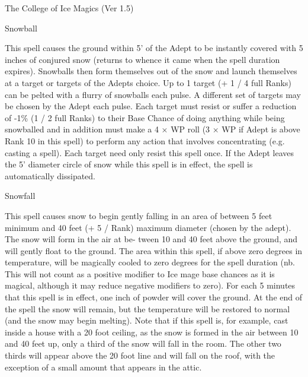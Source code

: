 \begin{Chapter}{The College of Ice Magics (Ver 1.5)}
\begin{spell}[S-13]{Snowball}
\begin{effects}
This spell causes the ground within 5’ of the Adept to be instantly
covered with 5 inches of conjured snow (returns to whence it came when
the spell duration expires). Snowballs then form themselves out of the
snow and launch themselves at a target or targets of the Adepts
choice.  Up to 1 target (+ 1 / 4 full Ranks) can be pelted with a
flurry of snowballs each pulse.  A different set of targets may be
chosen by the Adept each pulse.  Each target must resist or suffer a
reduction of -1\% (1 / 2 full Ranks) to their Base Chance of doing
anything while being snowballed and in addition must make a 4 × WP
roll (3 × WP if Adept is above Rank 10 in this spell) to perform any
action that involves concentrating (e.g.  casting a spell).  Each
target need only resist this spell once.  If the Adept leaves the 5’
diameter circle of snow while this spell is in effect, the spell is
automatically dissipated.
\end{effects}
\end{spell}

\begin{spell}[S-14]{Snowfall}
\begin{effects}
This spell causes snow to begin gently falling in an area of between 5
feet minimum and 40 feet (+ 5 / Rank) maximum diameter (chosen by the
adept).  The snow will form in the air at be- tween 10 and 40 feet
above the ground, and will gently float to the ground.  The area
within this spell, if above zero degrees in temperature, will be
magically cooled to zero degrees for the spell duration (nb.  This
will not count as a positive modifier to Ice mage base chances as it
is magical, although it may reduce negative modifiers to zero).  For
each 5 minutes that this spell is in effect, one inch of powder will
cover the ground. At the end of the spell the snow will remain, but
the temperature will be restored to normal (and the snow may begin
melting).  Note that if this spell is, for example, cast inside a
house with a 20 foot ceiling, as the snow is formed in the air between
10 and 40 feet up, only a third of the snow will fall in the room.
The other two thirds will appear above the 20 foot line and will fall
on the roof, with the exception of a small amount that appears in the
attic.
\end{effects}
\end{spell}


\end{Chapter}
